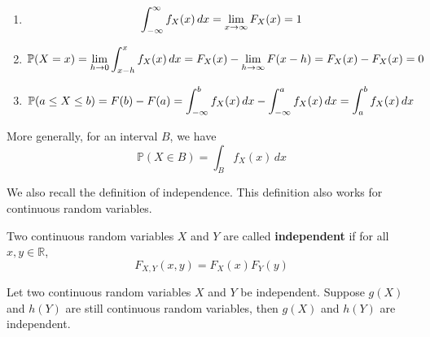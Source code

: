 \documentclass{huhtakm-template-book}
\newcommand{\prob}{\mathbb{P}}
\begin{document}
    \begin{proofing}
        \begin{enumerate}
            \item 
            \begin{equation*}
                \int_{-\infty}^{\infty} f_{X}(x)\,dx=\lim_{x\to\infty}F_{X}(x)=1
            \end{equation*}
            \item
            \begin{equation*}
                \prob(X=x)=\lim_{h\to 0}\intlu{x-h}{x}f_{X}(x)\,dx=F_{X}(x)-\lim_{h\to\infty}F(x-h)=F_{X}(x)-F_{X}(x)=0
            \end{equation*}
            \item
            \begin{equation*}
                \prob(a\leq X\leq b)=F(b)-F(a)=\intlu{-\infty}{b}f_{X}(x)\,dx-\intlu{-\infty}{a}f_{X}(x)\,dx=\intlu{a}{b}f_{X}(x)\,dx
            \end{equation*}
        \end{enumerate}
    \end{proofing}
    \begin{rem}
        More generally, for an interval $B$, we have
        \begin{equation*}
            \prob(X\in B)=\int_{B}f_{X}(x)\,dx
        \end{equation*}
    \end{rem}

    \newpage
    We also recall the definition of independence. This definition also works for continuous random variables.
    \begin{defn}
        Two continuous random variables $X$ and $Y$ are called \textbf{independent} if for all $x,y\in\mathbb{R}$,
        \begin{equation*}
            F_{X,Y}(x,y)=F_{X}(x)F_{Y}(y)
        \end{equation*}
    \end{defn}
    \begin{thm}
        Let two continuous random variables $X$ and $Y$ be independent. Suppose $g(X)$ and $h(Y)$ are still continuous random variables, then $g(X)$ and $h(Y)$ are independent.
    \end{thm}
\end{document}
